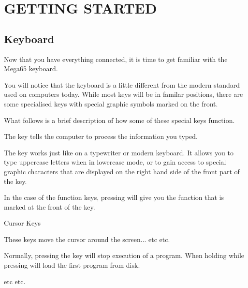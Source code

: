 \chapter{GETTING STARTED}
\section{Keyboard}

Now that you have everything connected, it is time to get familiar with the Mega65 keyboard.

You will notice that the keyboard is a little different from the modern standard used on computers today. While most keys will be in familar positions, there are some specialised keys with special graphic symbols marked on the front.

What follows is a brief description of how some of these special keys function.

 \vspace*{1cm}


The  key tells the computer to process the information you typed.

 \vspace*{1cm}


The  key works just like on a typewriter or modern keyboard. It allows you to type uppercase letters when in lowercase mode, or to gain access to special graphic characters that are displayed on the right hand side of the front part of the key.

In the case of the function keys, pressing  will give you the function that is marked at the front of the key.

 \vspace*{1cm}

\megakey{$\leftarrow$} \megakey{$\uparrow$} \megakey{$\rightarrow$} \megakey{$\downarrow$} Cursor Keys

These keys move the cursor around the screen... etc etc.

 \vspace*{1cm}


Normally, pressing the  key will stop execution of a program. When holding  while pressing  will load the first program from disk.

 \vspace*{1cm}


etc etc.

